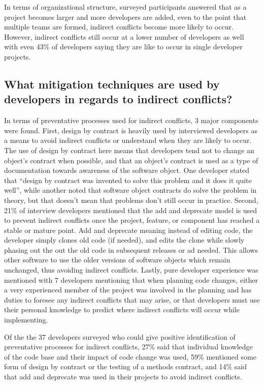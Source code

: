\documentclass[conference]{IEEEtran}
\begin{document}
In terms of organizational structure, surveyed participants answered that as a project becomes larger and more 
developers are added, even to the point that multiple teams are formed, indirect conflicts become more likely to
occur. However, indirect conflicts still occur at a lower number of developers as well with even 43\% of developers
saying they are like to occur in single developer projects.

\subsection{What mitigation techniques are used by developers in regards to indirect conflicts?}

In terms of preventative processes used for indirect conflicts, 3 major components were found.
First, design by contract is heavily used by interviewed developers as a means to avoid indirect conflicts or understand
when they are likely to occur. The use of design by contract here means that developers tend not to change an object's
contract when possible, and that an object's contract is used as a type of documentation towards awareness of the 
software object. One developer stated that ``design by contract was invented to solve this problem and it does it 
quite well'', while another noted that software object contracts do solve the problem in theory, but that doesn't 
mean that problems don't still occur in practice.
Second, 21\% of interview developers mentioned that the add and deprecate 
model is used to prevent indirect conflicts once
the project, feature, or component has reached a stable or mature point.
Add and deprecate meaning instead of editing code, the developer simply clones old code (if needed), and edits the clone
while slowly phasing out the out the old code in subsequent releases or ad needed. This allows other software to 
use the older versions of software objects which remain unchanged, thus avoiding indirect conflicts.
Lastly, pure developer experience was mentioned with 7 developers mentioning that when planning code changes, 
either a very experienced member of the project was involved in the planning and has duties to foresee any 
indirect conflicts that may arise, or that developers must use their personal knowledge to predict where indirect 
conflicts will occur while implementing.

Of the the 37 developers surveyed who could give positive identification of preventative processes for indirect conflicts,
27\% said that individual knowledge of the code base and their impact of code change was used, 59\% mentioned some form of design
by contract or the testing of a methods contract, and 14\% said that add and
deprecate was used in their projects to avoid indirect conflicts.
\end{document}
